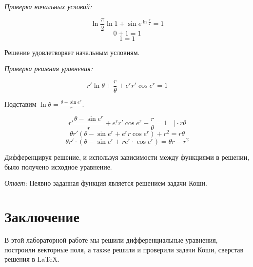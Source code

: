 \documentclass[14pt, a4paper, titlepage, fleqn]{extarticle}
\begin{document}
        \textit{Проверка начальных условий:}

            \[ \ln{\frac{\pi}{2}} \ln{1} + \sin{e^{\ln{\frac{\pi}{2}}}} = 1 \]
            \[ 0 + 1 = 1 \]
            \[ 1 = 1 \]

        Решение удовлетворяет начальным условиям.

        \textit{Проверка решения уравнения:}

            \[ r' \ln{\theta} + \frac{r}{\theta} +  e^r r'\cos{e^r} = 1 \]

        Подставим
        \( 
            \displaystyle  
            \ln{\theta} = \frac{\theta - \sin{e^r}}{r}.
        \)
        
        \[ 
            r' \frac{\theta - \sin{e^r}}{r} +  e^r r'\cos{e^r} + \frac{r}{\theta} = 1 
            \quad \vert \cdot r \theta
        \]
        \[ \theta r' \left( \theta - \sin{e^r} + e^r r \cos{e^r} \right) + r^2 = r \theta \]
        \[ \theta r' \cdot \left( \theta - \sin{e^r} + r e^r \cdot \cos{e^r} \right) = \theta r - r^2 \]
    
        Дифференцируя решение, и используя зависимости между функциями в решении,
        было получено исходное уравнение.

        \textit{Ответ:} Неявно заданная функция является решением задачи Коши.
    \pagebreak

    \section{Заключение}
        В этой лабораторной работе мы решили дифференциальные
        уравнения, построили векторные поля, а также решили и проверили задачи Коши,
        сверстав решения в \LaTeX.
\end{document}
